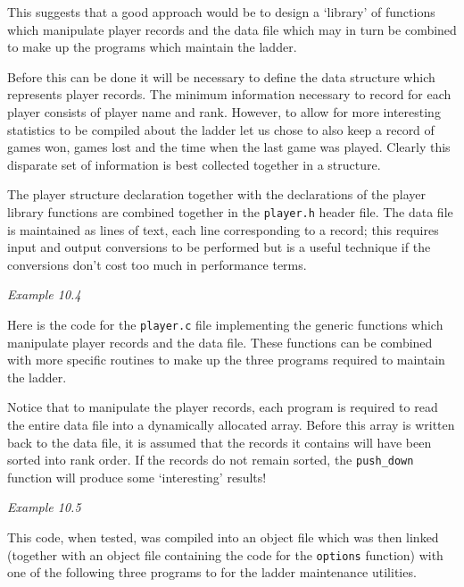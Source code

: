   This suggests that a good approach would be to design a `library' of
   functions which manipulate player records and the data file which may in
   turn be combined to make up the programs which maintain the ladder.


  Before this can be done it will be necessary to define the data structure
   which represents player records. The minimum information necessary to record
   for each player consists of player name and rank. However, to allow for more
   interesting statistics to be compiled about the ladder let us chose to also
   keep a record of games won, games lost and the time when the last game was
   played. Clearly this disparate set of information is best collected together
   in a structure.


  The player structure declaration together with the declarations of the
   player library functions are combined together in the \texttt{player.h}
   header file. The data file is maintained as lines of text, each line
   corresponding to a record; this requires input and output conversions to be
   performed but is a useful technique if the conversions don't cost too much
   in performance terms.


  \begin{center}\textit{Example 10.4}\end{center}


  Here is the code for the \texttt{player.c} file implementing the
   generic functions which manipulate player records and the data file. These
   functions can be combined with more specific routines to make up the three
   programs required to maintain the ladder.


  Notice that to manipulate the player records, each program is required to
   read the entire data file into a dynamically allocated array. Before this
   array is written back to the data file, it is assumed that the records it
   contains will have been sorted into rank order. If the records do not remain
   sorted, the \texttt{push\_down} function will produce some
   `interesting' results!


  \begin{center}\textit{Example 10.5}\end{center}


  This code, when tested, was compiled into an object file which was then
   linked (together with an object file containing the code for the
   \texttt{options} function) with one of the following three programs to
   for the ladder maintenance utilities.


